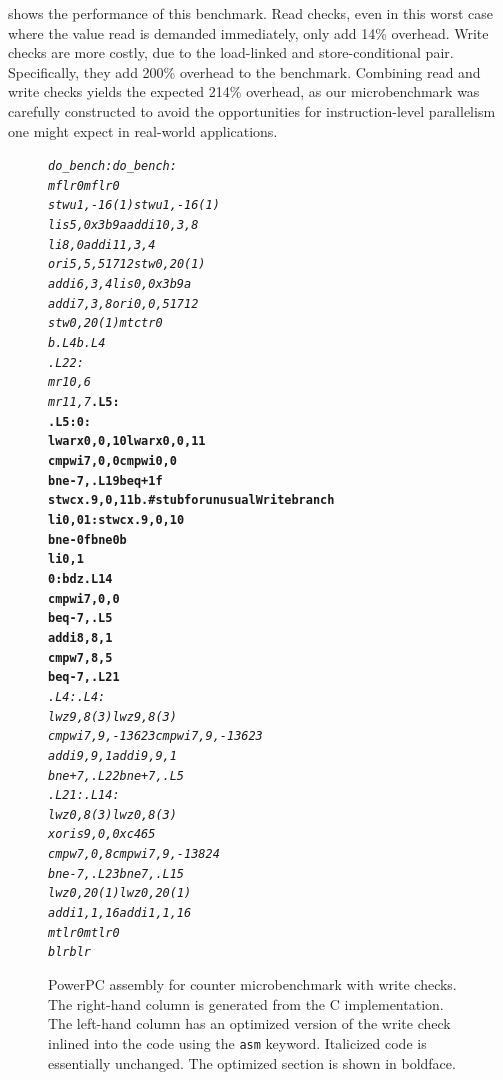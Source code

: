 
 shows the performance of this benchmark.
Read checks, even in this worst case where the value read is demanded
immediately, only add 14\% overhead.  Write checks are more costly,
due to the load-linked and store-conditional pair.  Specifically, they add 200\%
overhead to the benchmark.  Combining read and write checks yields the
expected 214\% overhead, as our microbenchmark was carefully constructed to
avoid the opportunities for instruction-level parallelism one might
expect in real-world applications.

\begin{figure}
\sis\fontsize{9}{10}\begin{alltt}
\textit{do_bench:              do_bench:
  mflr 0                 mflr 0
  stwu 1,-16(1)          stwu 1,-16(1)
  lis 5,0x3b9a           addi 10,3,8
  li 8,0                 addi 11,3,4
  ori 5,5,51712          stw 0,20(1)
  addi 6,3,4             lis 0,0x3b9a
  addi 7,3,8             ori 0,0,51712
  stw 0,20(1)            mtctr 0
  b .L4                  b .L4
.L22:
  mr 10,6
  mr 11,7              }\textbf{.L5:
.L5:                   0:
  lwarx 0,0,10           lwarx 0,0,11
  cmpwi 7,0,0            cmpwi 0,0
  bne- 7,.L19            beq+ 1f
  stwcx. 9,0,11          b . # stub for unusualWrite branch
  li 0,0               1:stwcx. 9,0,10
  bne- 0f                bne 0b
  li 0,1
0:                       bdz .L14
  cmpwi 7,0,0
  beq- 7,.L5
  addi 8,8,1
  cmpw 7,8,5
  beq- 7,.L21}\textit{
.L4:                   .L4:
  lwz 9,8(3)             lwz 9,8(3)
  cmpwi 7,9,-13623       cmpwi 7,9,-13623
  addi 9,9,1             addi 9,9,1
  bne+ 7,.L22            bne+ 7,.L5
.L21:                  .L14:
  lwz 0,8(3)             lwz 0,8(3)
                         xoris 9,0,0xc465
  cmpw 7,0,8             cmpwi 7,9,-13824
  bne- 7,.L23            bne 7,.L15
  lwz 0,20(1)            lwz 0,20(1)
  addi 1,1,16            addi 1,1,16
  mtlr 0                 mtlr 0             
  blr                    blr}
\end{alltt}
\caption[PowerPC assembly for counter microbenchmark with
  write checks.]{PowerPC assembly for counter microbenchmark with
  write checks.  The right-hand column is generated from the C
  implementation.  The left-hand column has an optimized version of the
  write check inlined into the code using the \texttt{asm} keyword.
  Italicized code is essentially unchanged.  The optimized section is
  shown in boldface.}
\label{fig:write-assem}
\end{figure}
